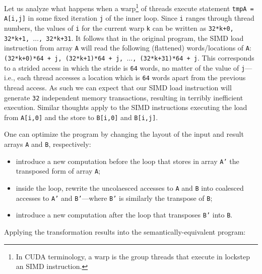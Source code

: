 \documentclass[acmsmall,review]{acmart}\settopmatter{printfolios=true,printccs=false,printacmref=false}
\begin{document}
Let us analyze what happens when a warp\footnote{
In CUDA terminology, a warp is the group threads that execute 
in lockstep an SIMD instruction. 
}
of threads execute statement {\tt tmpA = A[i,j]} in some fixed iteration 
{\tt j} of the inner loop. Since {\tt i} ranges through thread numbers, 
the values of {\tt i} for the current warp {\tt k} can be written 
as {\tt 32*k+0, 32*k+1, $\ldots$, 32*k+31}. It follows that in the original
program, the SIMD load instruction from array {\tt A} will read the following 
(flattened) words/locations of {\tt A}:
{\tt (32*k+0)*64 + j, (32*k+1)*64 + j, $\ldots$, (32*k+31)*64 + j}.
This corresponds to a strided access in which the stride is {\tt 64} words,
no matter of the value of {\tt j}---i.e., each thread accesses a location 
which is {\tt 64} words apart from the previous thread access. As such
we can expect that our SIMD load instruction will generate {\tt 32} 
independent memory transactions, resulting in terribly inefficient
execution.  Similar thoughts apply to the SIMD instructions executing
the load from {\tt A[i,0]} and the store to {\tt B[i,0]} and {\tt B[i,j]}.

One can optimize the program by changing the layout of the input and result
arrays {\tt A} and {\tt B}, respectively:
\begin{itemize}
    \item[(1)] introduce a new computation before the loop that stores in 
        array {\tt A'} the transposed form of array {\tt A};
    \item[(2)] inside the loop, rewrite the uncolaesced accesses to {\tt A} 
        and {\tt B} into coalesced accesses to {\tt A'} and {\tt B'}---where 
        {\tt B'} is similarly the transpose of {\tt B};
    \item[(3)] introduce a new computation after the loop that transposes
        {\tt B'} into {\tt B}.
\end{itemize} 
Applying the transformation results into the semantically-equivalent program:
\newpage
\end{document}
